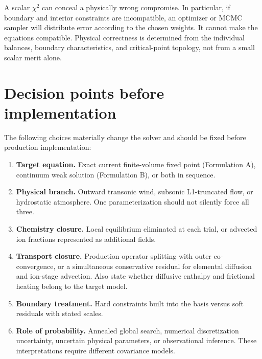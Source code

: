 \documentclass[english,a4paper]{my_memo}
\begin{document}
A scalar \(\chi^2\) can conceal a physically wrong compromise.  In particular,
if boundary and interior constraints are incompatible, an optimizer or MCMC
sampler will distribute error according to the chosen weights.  It cannot make
the equations compatible.  Physical correctness is determined from the
individual balances, boundary characteristics, and critical-point topology,
not from a small scalar merit alone.

\section{Decision points before implementation}\label{sec:decisions}

The following choices materially change the solver and should be fixed before
production implementation:
\begin{enumerate}
\item \textbf{Target equation.} Exact current finite-volume fixed point
  (Formulation A), continuum weak solution (Formulation B), or both in sequence.
\item \textbf{Physical branch.} Outward transonic wind, subsonic L1-truncated
  flow, or hydrostatic atmosphere.  One parameterization should not silently
  force all three.
\item \textbf{Chemistry closure.} Local equilibrium eliminated at each trial,
  or advected ion fractions represented as additional fields.
\item \textbf{Transport closure.} Production operator splitting with outer
  co-convergence, or a simultaneous conservative residual for elemental
  diffusion and ion-stage advection.  Also state whether diffusive enthalpy and
  frictional heating belong to the target model.
\item \textbf{Boundary treatment.} Hard constraints built into the basis versus
  soft residuals with stated scales.
\item \textbf{Role of probability.} Annealed global search, numerical
  discretization uncertainty, uncertain physical parameters, or observational
  inference.  These interpretations require different covariance models.
\end{enumerate}
\end{document}
